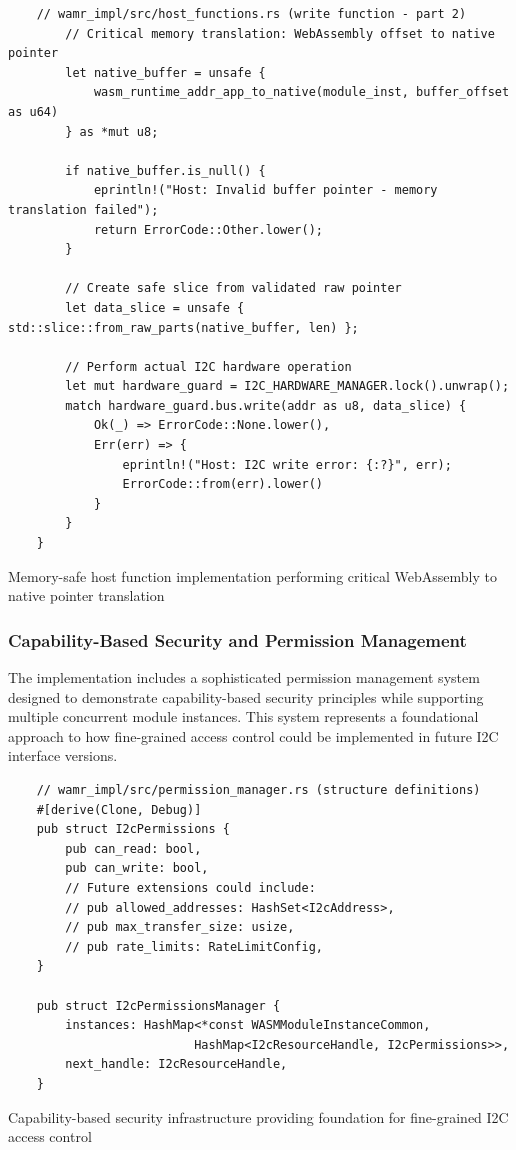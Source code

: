 \begin{listing}[H]
    \begin{verbatim}
    // wamr_impl/src/host_functions.rs (write function - part 2)
        // Critical memory translation: WebAssembly offset to native pointer
        let native_buffer = unsafe {
            wasm_runtime_addr_app_to_native(module_inst, buffer_offset as u64)
        } as *mut u8;
        
        if native_buffer.is_null() {
            eprintln!("Host: Invalid buffer pointer - memory translation failed");
            return ErrorCode::Other.lower();
        }
    
        // Create safe slice from validated raw pointer
        let data_slice = unsafe { std::slice::from_raw_parts(native_buffer, len) };
        
        // Perform actual I2C hardware operation
        let mut hardware_guard = I2C_HARDWARE_MANAGER.lock().unwrap();
        match hardware_guard.bus.write(addr as u8, data_slice) {
            Ok(_) => ErrorCode::None.lower(),
            Err(err) => {
                eprintln!("Host: I2C write error: {:?}", err);
                ErrorCode::from(err).lower()
            }
        }
    }
    \end{verbatim}
    \caption{Memory-safe host function implementation performing critical WebAssembly to native pointer translation}
    \label{lst:wamr-host-function-pt2}
\end{listing}

\subsubsection{Capability-Based Security and Permission Management}

The implementation includes a sophisticated permission management system designed to demonstrate capability-based security principles while supporting multiple concurrent module instances. This system represents a foundational approach to how fine-grained access control could be implemented in future I2C interface versions.

\begin{listing}[H]
    \begin{verbatim}
    // wamr_impl/src/permission_manager.rs (structure definitions)
    #[derive(Clone, Debug)]
    pub struct I2cPermissions {
        pub can_read: bool,
        pub can_write: bool,
        // Future extensions could include:
        // pub allowed_addresses: HashSet<I2cAddress>,
        // pub max_transfer_size: usize,
        // pub rate_limits: RateLimitConfig,
    }
    
    pub struct I2cPermissionsManager {
        instances: HashMap<*const WASMModuleInstanceCommon, 
                          HashMap<I2cResourceHandle, I2cPermissions>>,
        next_handle: I2cResourceHandle,
    }
    \end{verbatim}
    \caption{Capability-based security infrastructure providing foundation for fine-grained I2C access control}
    \label{lst:permission-structures}
\end{listing}

